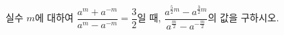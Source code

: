 실수 $m$에 대하여 $\dfrac{a^m+a^{-m}}{a^m-a^{-m}}=\dfrac{3}{2}$일 때, $\dfrac{a^{\frac{5}{2}m}-a^{\frac{3}{2}m}}{a^{\frac{m}{2}}-a^{-\frac{m}{2}}}$의 값을 구하시오. 
